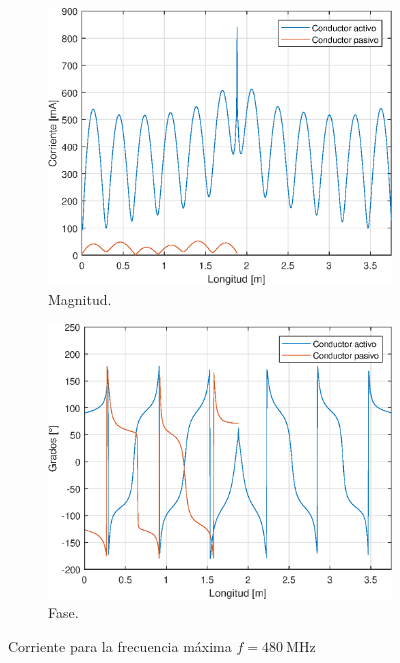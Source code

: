 \begin{figure}[H]
\begin{subfigure}{0.5\textwidth}
		\includegraphics[scale=0.6]{imagenes/i_mag_480.eps}
		\caption{Magnitud.}
	\end{subfigure}
	\quad
	\begin{subfigure}{0.5\textwidth}
		\includegraphics[scale=0.6]{imagenes/i_fase_480.eps}
		\caption{Fase.}
	\end{subfigure}
	\caption{Corriente para la frecuencia máxima $f = \SI{480}{\mega\hertz}$}
\end{figure}


